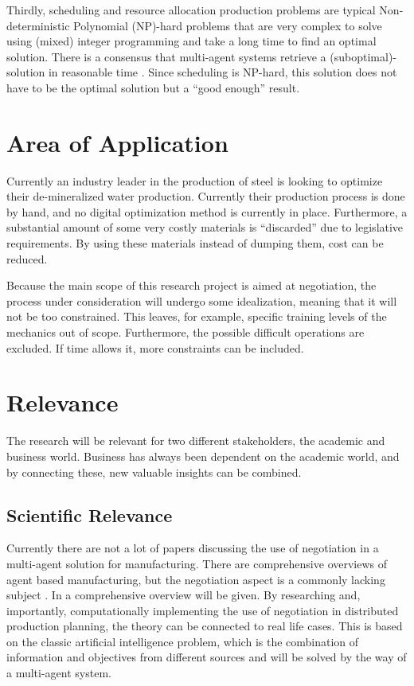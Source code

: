 Thirdly, scheduling and resource allocation production problems are typical Non-deterministic Polynomial (NP)-hard problems that are very complex to solve using (mixed) integer programming and take a long time to find an optimal solution. There is a consensus that multi-agent systems retrieve a (suboptimal)-solution in reasonable time \citep{konolige1980multiple}. Since scheduling is NP-hard, this solution does not have to be the optimal solution but a ``good enough'' result.

\section{Area of Application}

Currently an industry leader in the production of steel is looking to optimize their de-mineralized water production. Currently their production process is done by hand, and no digital optimization method is currently in place. Furthermore, a substantial amount of some very costly materials is ``discarded'' due to legislative requirements. By using these materials instead of dumping them, cost can be reduced.

Because the main scope of this research project is aimed at negotiation, the process under consideration will undergo some idealization, meaning that it will not be too constrained. This leaves, for example, specific training levels of the mechanics out of scope. Furthermore, the possible difficult operations are excluded.  If time allows it, more constraints can be included.


\section{Relevance}%
The research will be relevant for two different stakeholders, the academic and business world. Business has always been dependent on the academic world, and by connecting these, new valuable insights can be combined.
\subsection{Scientific Relevance}
Currently there are not a lot of papers discussing the use of negotiation in a multi-agent solution for manufacturing. There are comprehensive overviews of agent based manufacturing, but the negotiation aspect is a commonly lacking subject \citep{leitao2009agent}. In  a comprehensive overview will be given. By researching and, importantly, computationally implementing the use of negotiation in distributed production planning, the theory can be connected to real life cases. This is based on the classic artificial intelligence problem, which is the combination of information and objectives from different sources and will be solved by the way of a multi-agent system.

